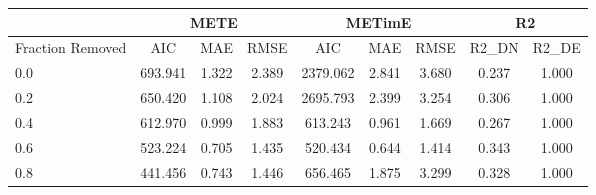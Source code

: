 \begin{tabular}{lccc ccc cc}
 \multicolumn{1}{c}{} & \multicolumn{3}{c}{METE} & \multicolumn{3}{c}{METimE} & \multicolumn{2}{c}{R2} \\
 \cmidrule(lr){2-4} \cmidrule(lr){5-7} \cmidrule(lr){8-9}
\toprule
Fraction Removed & AIC & MAE & RMSE & AIC & MAE & RMSE & R2_DN & R2_DE \\
\midrule
0.0 & 693.941 & 1.322 & 2.389 & 2379.062 & 2.841 & 3.680 & 0.237 & 1.000 \\
0.2 & 650.420 & 1.108 & 2.024 & 2695.793 & 2.399 & 3.254 & 0.306 & 1.000 \\
0.4 & 612.970 & 0.999 & 1.883 & 613.243 & 0.961 & 1.669 & 0.267 & 1.000 \\
0.6 & 523.224 & 0.705 & 1.435 & 520.434 & 0.644 & 1.414 & 0.343 & 1.000 \\
0.8 & 441.456 & 0.743 & 1.446 & 656.465 & 1.875 & 3.299 & 0.328 & 1.000 \\
\bottomrule
\end{tabular}